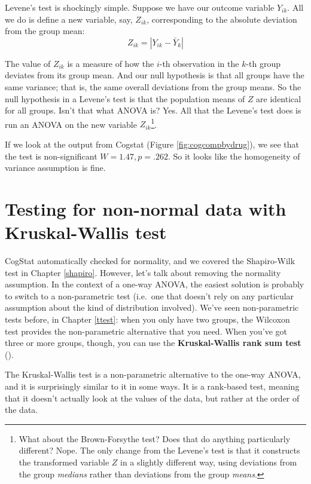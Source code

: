 \documentclass[
  11pt,
  a4paper,
  twoside,symmetric,openright]{book}
\theoremstyle{break}
\theoremstyle{break}
\begin{document}
Levene's test is shockingly simple. Suppose we have our outcome variable \(Y_{ik}\). All we do is define a new variable, say, \(Z_{ik}\), corresponding to the absolute deviation from the group mean:
\[
Z_{ik} = \left| Y_{ik} - \bar{Y}_k \right|
\]

The value of \(Z_{ik}\) is a measure of how the \(i\)-th observation in the \(k\)-th group deviates from its group mean. And our null hypothesis is that all groups have the same variance; that is, the same overall deviations from the group means. So the null hypothesis in a Levene's test is that the population means of \(Z\) are identical for all groups. Isn't that what ANOVA is? Yes. All that the Levene's test does is run an ANOVA on the new variable \(Z_{ik}\)\footnote{What about the Brown-Forsythe test? Does that do anything particularly different? Nope. The only change from the Levene's test is that it constructs the transformed variable \(Z\) in a slightly different way, using deviations from the group \emph{medians} rather than deviations from the group \emph{means}.}.

If we look at the output from Cogstat (Figure \ref{fig:cogcompbydrug}), we see that the test is non-significant \(W = 1.47, p = .262\). So it looks like the homogeneity of variance assumption is fine.

\section{Testing for non-normal data with Kruskal-Wallis test}\label{kruskalwallis}

CogStat automatically checked for normality, and we covered the Shapiro-Wilk test in Chapter \ref{shapiro}. However, let's talk about removing the normality assumption. In the context of a one-way ANOVA, the easiest solution is probably to switch to a non-parametric test (i.e.~one that doesn't rely on any particular assumption about the kind of distribution involved). We've seen non-parametric tests before, in Chapter \ref{ttest}: when you only have two groups, the Wilcoxon test provides the non-parametric alternative that you need. When you've got three or more groups, though, you can use the \textbf{Kruskal-Wallis rank sum test} ().

The Kruskal-Wallis test is a non-parametric alternative to the one-way ANOVA, and it is surprisingly similar to it in some ways. It is a rank-based test, meaning that it doesn't actually look at the values of the data, but rather at the order of the data.
\end{document}
